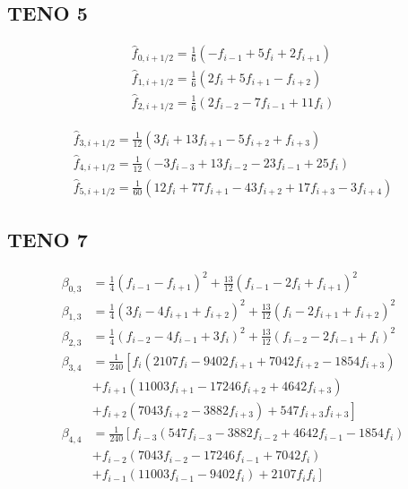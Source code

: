 \subsection{TENO 5}

\begin{equation}
\begin{array}{l}
\hat{f}_{0, i+1 / 2}=\frac{1}{6}\left(-f_{i-1}+5 f_{i}+2 f_{i+1}\right) \\
\hat{f}_{1, i+1 / 2}=\frac{1}{6}\left(2 f_{i}+5 f_{i+1}-f_{i+2}\right) \\
\hat{f}_{2, i+1 / 2}=\frac{1}{6}\left(2 f_{i-2}-7 f_{i-1}+11 f_{i}\right)
\end{array}
\end{equation}

\begin{equation}
\begin{array}{l}
\hat{f}_{3, i+1 / 2}=\frac{1}{12}\left(3 f_{i}+13 f_{i+1}-5 f_{i+2}+f_{i+3}\right) \\
\hat{f}_{4, i+1 / 2}=\frac{1}{12}\left(-3 f_{i-3}+13 f_{i-2}-23 f_{i-1}+25 f_{i}\right) \\
\hat{f}_{5, i+1 / 2}=\frac{1}{60}\left(12 f_{i}+77 f_{i+1}-43 f_{i+2}+17 f_{i+3}-3 f_{i+4}\right)
\end{array}
\end{equation}

\subsection{TENO 7}

\begin{equation}
\begin{aligned}
\beta_{0,3} &=\frac{1}{4}\left(f_{i-1}-f_{i+1}\right)^{2}+\frac{13}{12}\left(f_{i-1}-2 f_{i}+f_{i+1}\right)^{2} \\
\beta_{1,3} &=\frac{1}{4}\left(3 f_{i}-4 f_{i+1}+f_{i+2}\right)^{2}+\frac{13}{12}\left(f_{i}-2 f_{i+1}+f_{i+2}\right)^{2} \\
\beta_{2,3} &=\frac{1}{4}\left(f_{i-2}-4 f_{i-1}+3 f_{i}\right)^{2}+\frac{13}{12}\left(f_{i-2}-2 f_{i-1}+f_{i}\right)^{2} \\
\beta_{3,4} &=\frac{1}{240}\left[f_{i}\left(2107 f_{i}-9402 f_{i+1}+7042 f_{i+2}-1854 f_{i+3}\right)\right.\\
&+f_{i+1}\left(11003 f_{i+1}-17246 f_{i+2}+4642 f_{i+3}\right) \\
&\left.+f_{i+2}\left(7043 f_{i+2}-3882 f_{i+3}\right)+547 f_{i+3} f_{i+3}\right] \\
\beta_{4,4} &=\frac{1}{240}\left[f_{i-3}\left(547 f_{i-3}-3882 f_{i-2}+4642 f_{i-1}-1854 f_{i}\right)\right.\\
&+f_{i-2}\left(7043 f_{i-2}-17246 f_{i-1}+7042 f_{i}\right) \\
&\left.+f_{i-1}\left(11003 f_{i-1}-9402 f_{i}\right)+2107 f_{i} f_{i}\right]
\end{aligned}
\end{equation}

